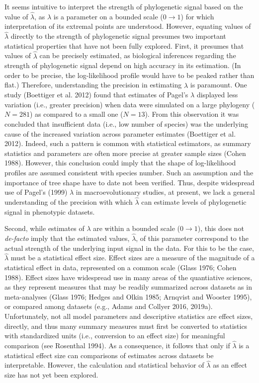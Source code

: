 \documentclass[]{article}
\begin{document}
It seems intuitive to interpret the strength of phylogenetic signal
based on the value of \(\hat{\lambda}\), as \(\lambda\) is a parameter
on a bounded scale (\(0\to1\)) for which interpretation of its extremal
points are understood. However, equating values of \(\hat{\lambda}\)
directly to the strength of phylogenetic signal presumes two important
statistical properties that have not been fully explored. First, it
presumes that values of \(\hat{\lambda}\) can be precisely estimated, as
biological inferences regarding the strength of phylogenetic signal
depend on high accuracy in its estimation. (In order to be precise, the
log-likelihood profile would have to be peaked rather than flat.)
Therefore, understanding the precision in estimating \(\hat{\lambda}\)
is paramount. One study (Boettiger et al. 2012) found that estimates of
Pagel's \(\lambda\) displayed less variation (i.e., greater precision)
when data were simulated on a large phylogeny (\(N=281\)) as compared to
a small one (\(N=13\)). From this observation it was concluded that
insufficient data (i.e., low number of species) was the underlying cause
of the increased variation across parameter estimates (Boettiger et al.
2012). Indeed, such a pattern is common with statistical estimators, as
summary statistics and parameters are often more precise at greater
sample sizes (Cohen 1988). However, this conclusion could imply that the
shape of log-likelihood profiles are assumed consistent with species
number. Such an assumption and the importance of tree shape have to date
not been verified. Thus, despite widespread use of Pagel's (1999)
\(\lambda\) in macroevolutionary studies, at present, we lack a general
understanding of the precision with which \(\hat{\lambda}\) can estimate
levels of phylogenetic signal in phenotypic datasets. \hfill\break

Second, while estimates of \(\lambda\) are within a bounded scale
(\(0\to1\)), this does not \emph{de-facto} imply that the estimated
values, \(\hat{\lambda}\), of this parameter correspond to the actual
strength of the underlying input signal in the data. For this to be the
case, \(\hat{\lambda}\) must be a statistical effect size. Effect sizes
are a measure of the magnitude of a statistical effect in data,
represented on a common scale (Glass 1976; Cohen 1988). Effect sizes
have widespread use in many areas of the quantiative sciences, as they
represent measures that may be readily summarized across datasets as in
meta-analyses (Glass 1976; Hedges and Olkin 1985; Arnqvist and Wooster
1995), or compared among datasets (e.g., Adams and Collyer 2016, 2019a).
Unfortunately, not all model parameters and descriptive statistics are
effect sizes, directly, and thus many summary measures must first be
converted to statistics with standardized units (i.e., conversion to an
effect size) for meaningful comparison (see Rosenthal 1994). As a
consequence, it follows that only if \(\hat{\lambda}\) is a statistical
effect size can comparisons of estimates across datasets be
interpretable. However, the calculation and statistical behavior of
\(\hat{\lambda}\) as an effect size has not yet been explored.
\hfill\break
\end{document}
